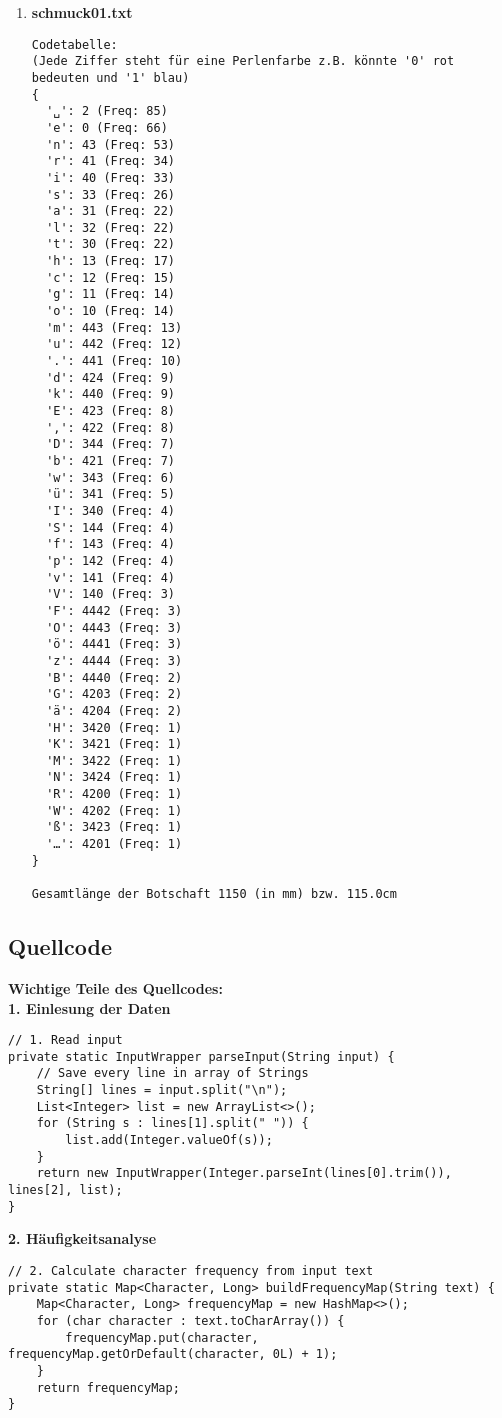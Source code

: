 \documentclass[a4paper,10pt,ngerman]{scrartcl}
\begin{document}
\begin{enumerate}
\item \textbf{schmuck01.txt}
\begin{verbatim}
Codetabelle:
(Jede Ziffer steht für eine Perlenfarbe z.B. könnte '0' rot bedeuten und '1' blau)
{
  '␣': 2 (Freq: 85)
  'e': 0 (Freq: 66)
  'n': 43 (Freq: 53)
  'r': 41 (Freq: 34)
  'i': 40 (Freq: 33)
  's': 33 (Freq: 26)
  'a': 31 (Freq: 22)
  'l': 32 (Freq: 22)
  't': 30 (Freq: 22)
  'h': 13 (Freq: 17)
  'c': 12 (Freq: 15)
  'g': 11 (Freq: 14)
  'o': 10 (Freq: 14)
  'm': 443 (Freq: 13)
  'u': 442 (Freq: 12)
  '.': 441 (Freq: 10)
  'd': 424 (Freq: 9)
  'k': 440 (Freq: 9)
  'E': 423 (Freq: 8)
  ',': 422 (Freq: 8)
  'D': 344 (Freq: 7)
  'b': 421 (Freq: 7)
  'w': 343 (Freq: 6)
  'ü': 341 (Freq: 5)
  'I': 340 (Freq: 4)
  'S': 144 (Freq: 4)
  'f': 143 (Freq: 4)
  'p': 142 (Freq: 4)
  'v': 141 (Freq: 4)
  'V': 140 (Freq: 3)
  'F': 4442 (Freq: 3)
  'O': 4443 (Freq: 3)
  'ö': 4441 (Freq: 3)
  'z': 4444 (Freq: 3)
  'B': 4440 (Freq: 2)
  'G': 4203 (Freq: 2)
  'ä': 4204 (Freq: 2)
  'H': 3420 (Freq: 1)
  'K': 3421 (Freq: 1)
  'M': 3422 (Freq: 1)
  'N': 3424 (Freq: 1)
  'R': 4200 (Freq: 1)
  'W': 4202 (Freq: 1)
  'ß': 3423 (Freq: 1)
  '…': 4201 (Freq: 1)
}

Gesamtlänge der Botschaft 1150 (in mm) bzw. 115.0cm
\end{verbatim}
\end{enumerate}

\subsection{Quellcode}
\textbf{Wichtige Teile des Quellcodes:}\\
\newline
\vspace{0.5em}
\textbf{1. Einlesung der Daten}
\begin{lstlisting}
// 1. Read input
private static InputWrapper parseInput(String input) {
    // Save every line in array of Strings
    String[] lines = input.split("\n");
    List<Integer> list = new ArrayList<>();
    for (String s : lines[1].split(" ")) {
        list.add(Integer.valueOf(s));
    }
    return new InputWrapper(Integer.parseInt(lines[0].trim()), lines[2], list);
}
\end{lstlisting}

\textbf{2. Häufigkeitsanalyse}
\begin{lstlisting}
// 2. Calculate character frequency from input text
private static Map<Character, Long> buildFrequencyMap(String text) {
    Map<Character, Long> frequencyMap = new HashMap<>();
    for (char character : text.toCharArray()) {
        frequencyMap.put(character, frequencyMap.getOrDefault(character, 0L) + 1);
    }
    return frequencyMap;
}
\end{lstlisting}
\end{document}
